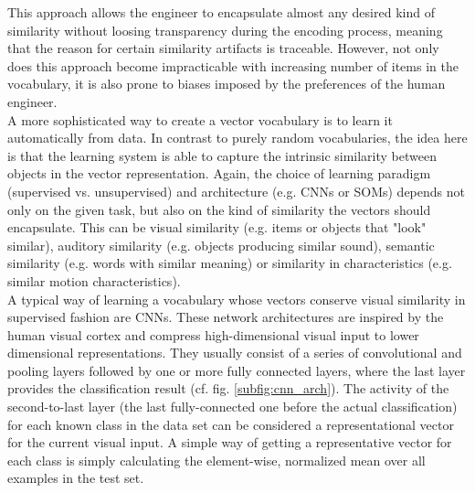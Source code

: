 This approach allows the engineer to encapsulate almost any desired kind of similarity without loosing transparency during the encoding process, meaning that the reason for certain similarity artifacts is traceable.
However, not only does this approach become impracticable with increasing number of items in the vocabulary, it is also prone to biases imposed by the preferences of the human engineer.\\
A more sophisticated way to create a vector vocabulary is to learn it automatically from data.
In contrast to purely random vocabularies, the idea here is that the learning system is able to capture the intrinsic similarity between objects in the vector representation.
Again, the choice of learning paradigm (supervised vs. unsupervised) and architecture (e.g. \acp{CNN} or \acp{SOM}) depends not only on the given task, but also on the kind of similarity the vectors should encapsulate.
This can be visual similarity (e.g. items or objects that "look" similar), auditory similarity (e.g. objects producing similar sound), semantic similarity (e.g. words with similar meaning) or similarity in characteristics (e.g. similar motion characteristics).\\
A typical way of learning a vocabulary whose vectors conserve visual similarity in supervised fashion are \acp{CNN}.
These network architectures are inspired by the human visual cortex and compress high-dimensional visual input to lower dimensional representations.
They usually consist of a series of convolutional and pooling layers followed by one or more fully connected layers, where the last layer provides the classification result (cf. fig. \ref{subfig:cnn_arch}).
The activity of the second-to-last layer (the last fully-connected one before the actual classification) for each known class in the data set can be considered a representational vector for the current visual input.
A simple way of getting a representative vector for each class is simply calculating the element-wise, normalized mean over all examples in the test set.
